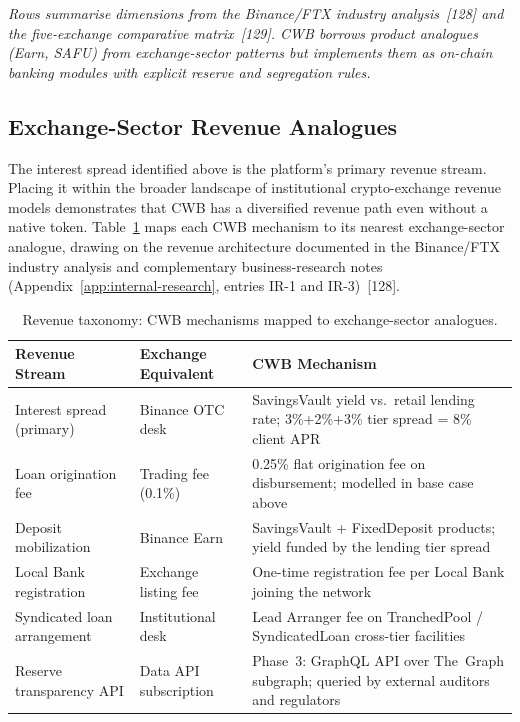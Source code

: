 \documentclass[12pt,a4paper]{report}
\newcommand{\tableheadcolor}{\rowcolor{TableHeadBg}}
\begin{document}
\vspace{2pt}
\noindent\textit{\small Rows summarise dimensions from the Binance/FTX industry analysis~[128] and the five-exchange comparative matrix~[129]. CWB borrows \textit{product analogues} (Earn, SAFU) from exchange-sector patterns but implements them as on-chain banking modules with explicit reserve and segregation rules.}

\subsection{Exchange-Sector Revenue Analogues}
\label{sec:revenue-analogues}

\noindent The interest spread identified above is the platform's primary revenue stream. Placing it within the broader landscape of institutional crypto-exchange revenue models demonstrates that CWB has a diversified revenue path even without a native token. Table~\ref{tab:revenue-taxonomy} maps each CWB mechanism to its nearest exchange-sector analogue, drawing on the revenue architecture documented in the Binance/FTX industry analysis and complementary business-research notes (Appendix~\ref{app:internal-research}, entries IR-1 and IR-3)~[128].

\begin{table}[H]
\centering
\caption[Revenue taxonomy vs.\ exchange analogues]{Revenue taxonomy: CWB mechanisms mapped to exchange-sector analogues.}
\label{tab:revenue-taxonomy}
\begin{tabular}{p{3.8cm}p{3.8cm}p{5.6cm}}
\toprule
\tableheadcolor
\textbf{Revenue Stream} & \textbf{Exchange Equivalent} & \textbf{CWB Mechanism} \\
\midrule
Interest spread (primary) & Binance OTC desk & SavingsVault yield vs.\ retail lending rate; 3\%+2\%+3\% tier spread = 8\% client APR \\
Loan origination fee & Trading fee (0.1\%) & 0.25\% flat origination fee on disbursement; modelled in base case above \\
Deposit mobilization & Binance Earn & SavingsVault + FixedDeposit products; yield funded by the lending tier spread \\
Local Bank registration & Exchange listing fee & One-time registration fee per Local Bank joining the network \\
Syndicated loan arrangement & Institutional desk & Lead Arranger fee on TranchedPool / SyndicatedLoan cross-tier facilities \\
Reserve transparency API & Data API subscription & Phase~3: GraphQL API over The~Graph subgraph; queried by external auditors and regulators \\
\bottomrule
\end{tabular}
\end{table}
\end{document}
